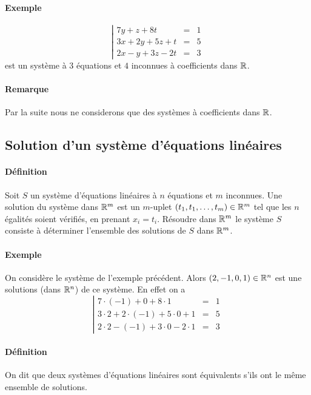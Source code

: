 \paragraph{Exemple}
$$\left\vert \begin{array}{rcl}
  7 y + z + 8 t & = & 1 \\
  3 x + 2 y + 5 z + t & = & 5 \\
  2 x - y + 3 z - 2 t & = & 3
\end{array} \right.$$
est un système à $3$ équations et $4$ inconnues à coefficients dans $\mathbb{R}$.

\paragraph{Remarque} Par la suite nous ne considerons que des systèmes à coefficients dans $\mathbb{R}$.

%
\subsection{Solution d'un système d'équations linéaires}
%
\paragraph{Définition} Soit $S$ un système d'équations linéaires à $n$ équations et $m$ inconnues. Une solution du système dans $\mathbb{R}^m$ est un $m$-uplet $(t_1, t_1, \ldots, t_m) \in \mathbb{R}^m$ tel que les $n$ égalités soient vérifiés, en prenant $x_i = t_i$. Résoudre dans $\mathbb{R}^m$ le système $S$ consiste à déterminer l'ensemble des solutions de $S$ dans $\mathbb{R}^m$.

\paragraph{Exemple} On considère le système de l'exemple précédent. Alors $(2, -1, 0, 1) \in \mathbb{R}^n$ est une solutions (dans $\mathbb{R}^n$) de ce système. En effet on a
$$\left\vert \begin{array}{rcl}
  7 \cdot (-1) + 0 + 8 \cdot 1 & = & 1 \\
  3 \cdot 2 + 2 \cdot (-1) + 5 \cdot 0 + 1 & = & 5 \\
  2 \cdot 2 - (-1) + 3 \cdot 0 - 2 \cdot 1 & = & 3
\end{array} \right.$$

\paragraph{Définition} On dit que deux systèmes d'équations linéaires sont équivalents s'ils ont le même ensemble de solutions.

